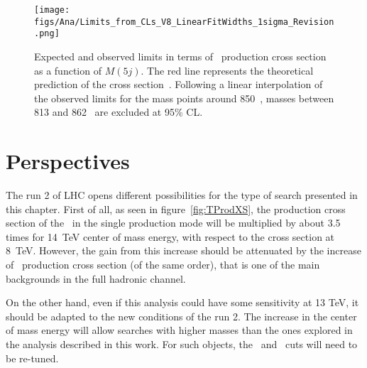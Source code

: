 \begin{figure}[!Hhtbp]
  \begin{center}
    \texttt{[image: figs/Ana/Limits\_from\_CLs\_V8\_LinearFitWidths\_1sigma\_Revision.png]}
    \caption{Expected and observed limits in terms of \Tp~production cross section as a function of $M(5j)$. The red line represents the theoretical prediction of the cross section~\cite{Buchkremer:2013bha, Cacciapaglia:2011fx}. Following a linear interpolation of the observed limits for the mass points around 850~\GeVcc, masses between 813 and 862 \GeVcc~are excluded at 95\% CL.}
    \label{fig:Lim}
  \end{center}
\end{figure}

\section{Perspectives}
\label{sec:pers}

The run 2 of LHC opens different possibilities for the type of search presented in this chapter. First of all, as seen in figure~\ref{fig:TProdXS}, the production cross section of the \Tp~in the single production mode will be multiplied by about 3.5 times for 14~TeV center of mass energy, with respect to the cross section at 8~TeV. However, the gain from this increase should be attenuated by the increase of \ttbar~production cross section (of the same order), that is one of the main backgrounds in the full hadronic channel. 

On the other hand, even if this analysis could have some sensitivity at 13 TeV, it should be adapted to the new conditions of the run 2. The increase in the center of mass energy will allow searches with higher masses than the ones explored in the analysis described in this work. For such objects, the \pt~and \HT~cuts will need to be re-tuned. %

